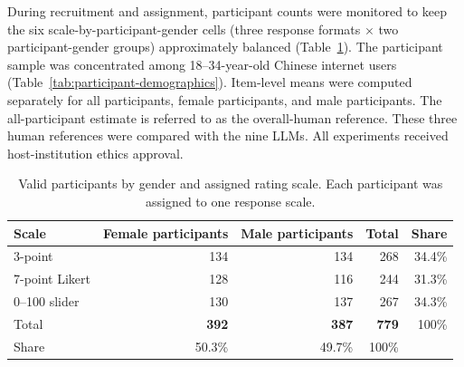 \documentclass[a4paper,fleqn,review]{cas-sc}
\begin{document}
During recruitment and assignment, participant counts were monitored to keep the six scale-by-participant-gender cells (three response formats $\times$ two participant-gender groups) approximately balanced (Table~\ref{tab:session-balance}). The participant sample was concentrated among 18--34-year-old Chinese internet users (Table~\ref{tab:participant-demographics}). Item-level means were computed separately for all participants, female participants, and male participants. The all-participant estimate is referred to as the overall-human reference. These three human references were compared with the nine LLMs. All experiments received host-institution ethics approval.

\begin{table}[pos=H]
  \centering
  \begin{tabular}{lrrr|r}
    \toprule
    Scale & Female participants & Male participants & Total & Share \\
    \midrule
    3-point & 134 & 134 & 268 & 34.4\% \\
    7-point Likert & 128 & 116 & 244 & 31.3\% \\
    0--100 slider & 130 & 137 & 267 & 34.3\% \\
    \midrule
    Total & \textbf{392} & \textbf{387} & \textbf{779} & 100\% \\
    Share & 50.3\% & 49.7\% & 100\% & \\
    \bottomrule
  \end{tabular}
  \caption{Valid participants by gender and assigned rating scale. Each participant was assigned to one response scale.}
  \label{tab:session-balance}
\end{table}
\end{document}
